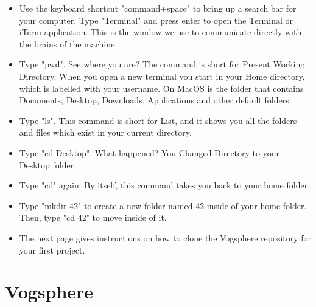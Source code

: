 \documentclass{42-en}
\begin{document}
\begin{itemize}

\item Use the keyboard shortcut "command+space" to bring up a search bar for your computer. Type "Terminal" and press enter to open the Terminal or iTerm application. This is the window we use to communicate directly with the brains of the machine.

\item Type "pwd". See where you are? The command is short for Present Working Directory. When you open a new terminal you start in your Home directory, which is labelled with your username. On MacOS is the folder that contains Documents, Desktop, Downloads, Applications and other default folders.

\item Type "ls". This command is short for List, and it shows you all the folders and files which exist in your current directory.

\item Type "cd Desktop". What happened? You Changed Directory to your Desktop folder.

\item Type "cd" again. By itself, this command takes you back to your home folder.

\item Type "mkdir 42" to create a new folder named 42 inside of your home folder. Then, type "cd 42" to move inside of it.

\item The next page gives instructions on how to clone the Vogsphere repository for your first project.

\end{itemize}



\chapter{Vogsphere}
\end{document}
